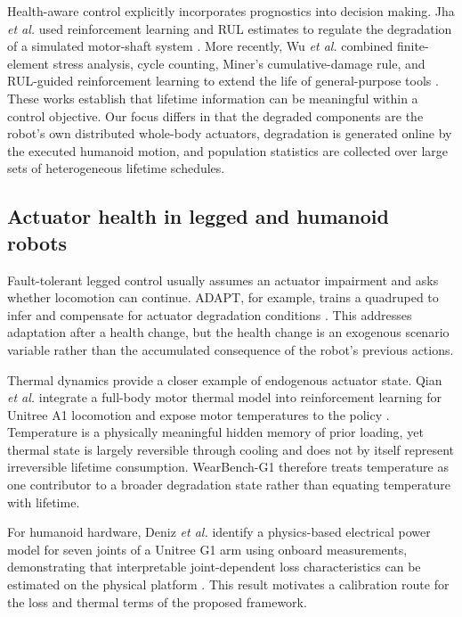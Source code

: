 \documentclass[letterpaper,10pt,conference]{ieeeconf}
\begin{document}
Health-aware control explicitly incorporates prognostics into decision making. Jha \emph{et al.} used reinforcement learning and RUL estimates to regulate the degradation of a simulated motor-shaft system \cite{jha2020health}. More recently, Wu \emph{et al.} combined finite-element stress analysis, cycle counting, Miner's cumulative-damage rule, and RUL-guided reinforcement learning to extend the life of general-purpose tools \cite{wu2025tool}. These works establish that lifetime information can be meaningful within a control objective. Our focus differs in that the degraded components are the robot's own distributed whole-body actuators, degradation is generated online by the executed humanoid motion, and population statistics are collected over large sets of heterogeneous lifetime schedules.

\subsection{Actuator health in legged and humanoid robots}

Fault-tolerant legged control usually assumes an actuator impairment and asks whether locomotion can continue. ADAPT, for example, trains a quadruped to infer and compensate for actuator degradation conditions \cite{wu2023adapt}. This addresses adaptation after a health change, but the health change is an exogenous scenario variable rather than the accumulated consequence of the robot's previous actions.

Thermal dynamics provide a closer example of endogenous actuator state. Qian \emph{et al.} integrate a full-body motor thermal model into reinforcement learning for Unitree A1 locomotion and expose motor temperatures to the policy \cite{qian2026thermal}. Temperature is a physically meaningful hidden memory of prior loading, yet thermal state is largely reversible through cooling and does not by itself represent irreversible lifetime consumption. WearBench-G1 therefore treats temperature as one contributor to a broader degradation state rather than equating temperature with lifetime.

For humanoid hardware, Deniz \emph{et al.} identify a physics-based electrical power model for seven joints of a Unitree G1 arm using onboard measurements, demonstrating that interpretable joint-dependent loss characteristics can be estimated on the physical platform \cite{deniz2026g1}. This result motivates a calibration route for the loss and thermal terms of the proposed framework.
\end{document}
